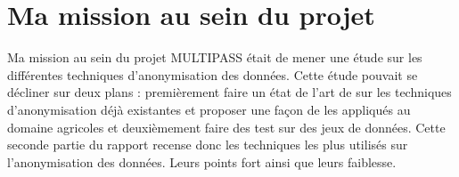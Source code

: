  \section{Ma mission au sein du projet} 

Ma mission au sein du projet MULTIPASS était de mener une étude sur les différentes techniques d’anonymisation des données. Cette étude pouvait se décliner sur deux plans : premièrement faire un état de l’art de sur les techniques d’anonymisation déjà existantes et proposer une façon de les appliqués au domaine agricoles et deuxièmement faire des test sur des jeux de données. Cette seconde partie du rapport recense donc les techniques les plus utilisés sur l’anonymisation des données. Leurs points fort ainsi que leurs faiblesse. 